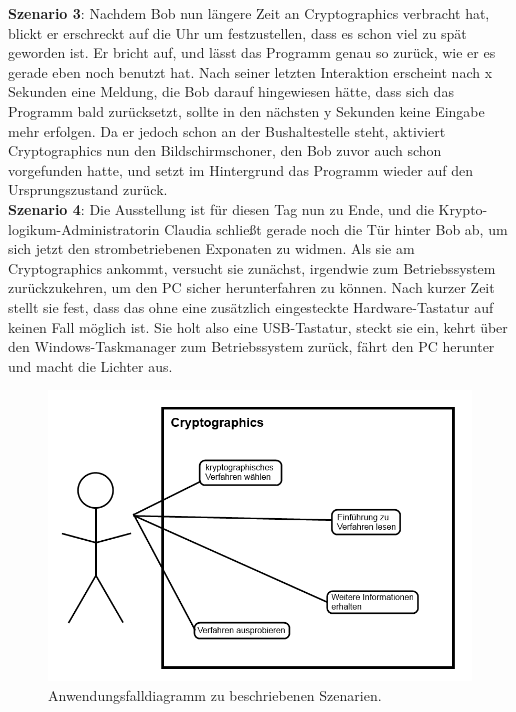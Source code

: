 \documentclass{article}
\begin{document}
\textbf{Szenario 3}:
Nachdem Bob nun längere Zeit an Cryptographics verbracht hat, blickt er erschreckt auf die Uhr um festzustellen, dass es schon viel zu spät geworden ist. Er bricht auf, und lässt das Programm genau so zurück, wie er es gerade eben noch benutzt hat. Nach seiner letzten Interaktion erscheint nach x Sekunden eine Meldung, die Bob darauf hingewiesen hätte, dass sich das Programm bald zurücksetzt, sollte in den nächsten y Sekunden keine Eingabe mehr erfolgen. Da er jedoch schon an der Bushaltestelle steht, aktiviert Cryptographics nun den Bildschirmschoner, den Bob zuvor auch schon vorgefunden hatte, und setzt im Hintergrund das Programm wieder auf den Ursprungszustand zurück.\\

\textbf{Szenario 4}:
Die Ausstellung ist für diesen Tag nun zu Ende, und die Krypto-logikum-Administratorin Claudia schließt gerade noch die Tür hinter Bob ab, um sich jetzt den strombetriebenen Exponaten zu widmen. Als sie am Cryptographics ankommt, versucht sie zunächst, irgendwie zum Betriebssystem zurückzukehren, um den PC sicher herunterfahren zu können. Nach kurzer Zeit stellt sie fest, dass das ohne eine zusätzlich eingesteckte Hardware-Tastatur auf keinen Fall möglich ist. Sie holt also eine USB-Tastatur, steckt sie ein, kehrt über den Windows-Taskmanager zum Betriebssystem zurück, fährt den PC herunter und macht die Lichter aus.\\

\begin{figure}[h!]
  \centering
    \includegraphics[width=\textwidth]{resources/usecase1}
  \caption{Anwendungsfalldiagramm zu beschriebenen Szenarien.}
\end{figure}
\end{document}
